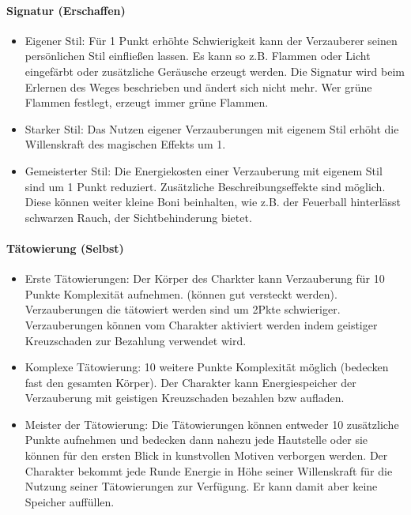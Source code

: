 \documentclass{article}
\begin{document}
\paragraph{Signatur (Erschaffen)}

\begin{itemize}
\item Eigener Stil: Für 1 Punkt erhöhte Schwierigkeit kann der Verzauberer seinen persönlichen Stil einfließen lassen. Es kann so z.B. Flammen oder Licht eingefärbt oder zusätzliche Geräusche erzeugt werden. Die Signatur wird beim Erlernen des Weges beschrieben und ändert sich nicht mehr. Wer grüne Flammen festlegt, erzeugt immer grüne Flammen.
\item Starker Stil: Das Nutzen eigener Verzauberungen mit eigenem Stil erhöht die Willenskraft des magischen Effekts um 1.
\item Gemeisterter Stil: Die Energiekosten einer Verzauberung mit eigenem Stil sind um 1 Punkt reduziert. Zusätzliche Beschreibungseffekte sind möglich. Diese können weiter kleine Boni beinhalten, wie z.B. der Feuerball hinterlässt schwarzen Rauch, der Sichtbehinderung bietet.
\end{itemize}

\paragraph{Tätowierung (Selbst)}

\begin{itemize}
\item Erste Tätowierungen: Der Körper des Charkter kann Verzauberung für 10 Punkte Komplexität aufnehmen. (können gut versteckt werden). Verzauberungen die tätowiert werden sind um 2Pkte schwieriger. Verzauberungen können vom Charakter aktiviert werden indem geistiger Kreuzschaden zur Bezahlung verwendet wird.
\item Komplexe Tätowierung: 10 weitere Punkte Komplexität möglich (bedecken fast den gesamten Körper). Der Charakter kann Energiespeicher der Verzauberung mit geistigen Kreuzschaden bezahlen bzw aufladen.
\item Meister der Tätowierung: Die Tätowierungen können entweder 10 zusätzliche Punkte aufnehmen und bedecken dann nahezu jede Hautstelle oder sie können für den ersten Blick in kunstvollen Motiven verborgen werden. Der Charakter bekommt jede Runde Energie in Höhe seiner Willenskraft für die Nutzung seiner Tätowierungen zur Verfügung. Er kann damit aber keine Speicher auffüllen.
\end{itemize}
\end{document}
